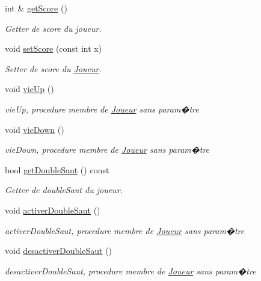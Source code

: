 \begin{DoxyCompactItemize}
int \& \hyperlink{classJoueur_aa92f778f986e150c708e4cfcbcdc8994}{get\+Score} ()
\begin{DoxyCompactList}\small\item\em Getter de score du joueur. \end{DoxyCompactList}\item 
void \hyperlink{classJoueur_a7da45ee15b13b73f2dc90b05714b0f41}{set\+Score} (const int x)
\begin{DoxyCompactList}\small\item\em Setter de score du \hyperlink{classJoueur}{Joueur}. \end{DoxyCompactList}\item 
void \hyperlink{classJoueur_a69f466f718df5ab72ade6fec1dab404a}{vie\+Up} ()
\begin{DoxyCompactList}\small\item\em vie\+Up, procedure membre de \hyperlink{classJoueur}{Joueur} sans param�tre \end{DoxyCompactList}\item 
void \hyperlink{classJoueur_afb0f71527a83c9de2da0d3ec0a6d2eb5}{vie\+Down} ()
\begin{DoxyCompactList}\small\item\em vie\+Down, procedure membre de \hyperlink{classJoueur}{Joueur} sans param�tre \end{DoxyCompactList}\item 
bool \hyperlink{classJoueur_a854fae0574f84fa3df548301dd7776fa}{get\+Double\+Saut} () const
\begin{DoxyCompactList}\small\item\em Getter de double\+Saut du joueur. \end{DoxyCompactList}\item 
void \hyperlink{classJoueur_af36c9e420b2870efdb60d5571465540d}{activer\+Double\+Saut} ()
\begin{DoxyCompactList}\small\item\em activer\+Double\+Saut, procedure membre de \hyperlink{classJoueur}{Joueur} sans param�tre \end{DoxyCompactList}\item 
void \hyperlink{classJoueur_a0c56fa459aaec50994d5e4c00b96155d}{desactiver\+Double\+Saut} ()
\begin{DoxyCompactList}\small\item\em desactiver\+Double\+Saut, procedure membre de \hyperlink{classJoueur}{Joueur} sans param�tre \end{DoxyCompactList}\item 

\end{DoxyCompactItemize}
